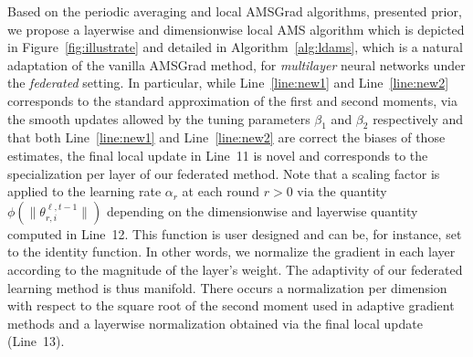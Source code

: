 \documentclass[11pt]{article}
\begin{document}
Based on the periodic averaging and local AMSGrad algorithms, presented prior, we propose a layerwise and dimensionwise local AMS algorithm which is depicted in Figure~\ref{fig:illustrate} and detailed in Algorithm~\ref{alg:ldams}, which is a natural adaptation of the vanilla AMSGrad method, for \emph{multilayer} neural networks under the \emph{federated} setting.
In particular, while Line~\ref{line:new1} and Line~\ref{line:new2} corresponds to the standard approximation of the first and second moments, via the smooth updates allowed by the tuning parameters $\beta_1$ and $\beta_2$ respectively and that both Line~\ref{line:new1} and Line~\ref{line:new2} are correct the biases of those estimates, the final local update in Line~11 is novel and corresponds to the specialization per layer of our federated method.
Note that a scaling factor is applied to the learning rate $\alpha_r$ at each round $r>0$ via the quantity $\phi(\|\theta_{r,i}^{\ell,t-1}\|)$ depending on the dimensionwise and layerwise quantity computed in Line~12.
This function is user designed and can be, for instance, set to the identity function. 
In other words, we normalize the gradient in each layer according to the magnitude of the layer's weight.
The adaptivity of our federated learning method is thus manifold. 
There occurs a normalization per dimension with respect to the square root of the second moment used in adaptive gradient methods and a layerwise normalization obtained via the final local update (Line~13).
\end{document}
